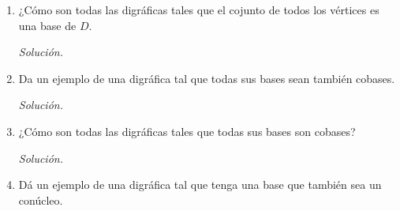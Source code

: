 \documentclass[12pt, fleqn]{article}
\newcommand{\tray}[2]{$ #1 #2 $ -- trayectoria}
\begin{document}
\begin{enumerate}
		Además, para $ u_4 $ no existe ninguna \tray{u_1}{u_4} ni una \tray{u_{13}}{u_4} en $D$, por lo que $ B $ tiene más elementos. Ya que la trayectoria $ T = (u_{11}, u_{10}, u_9, u_8, u_7, u_6, u_5, u_4) $ contiene a los demás vértices de $D$, se tiene que solo uno de estos vértices pertenece a $ B $, pues si más de uno perteneciera, entonces es posible hallar una trayectoria contenida en $T$ entre dos vértices de $ B $, lo cual sería a una contradicción al Teorema 21. 

		Ahora, $ u_4, u_5 \notin B $, ya que no es posible hallar una \tray{u_4}{u_6} ni una \tray{u_5}{u_6} en $D$. Pero si es posible hallar una \tray{u_i}{u_j} en $D$ para cada $ i = 6, \ldots, 11 $ y para cada $ j = 4, \ldots, 11 $. De esta forma, las siguientes son bases de $D$: 

		$ B_1 = \left\lbrace u_1, u_{6}, u_{13} \right\rbrace, B_2 = \left\lbrace u_1, u_{7}, u_{13} \right\rbrace, B_3 = \left\lbrace u_1, u_{8}, u_{13} \right\rbrace, B_4 = \left\lbrace u_1, u_{9}, u_{13} \right\rbrace, B_5 = \left\lbrace u_1, u_{10}, u_{13} \right\rbrace$ y $ B_6 = \left\lbrace u_1, u_{11}, u_{13} \right\rbrace $.

		Por otro lado, los vértices de ingrado cero y exgrado mayor a cero no pertenecen a ninguna co-base de $D$, puesto que no hay trayectorias que terminen en estos
		\item ¿Cómo son todas las digráficas tales que el cojunto de todos los vértices es una base de $D$.
		
		\emph{Solución.}

		
		
		\item Da un ejemplo de una digráfica tal que todas sus bases sean también cobases.
		
		\emph{Solución.}

		
		
		\item ¿Cómo son todas las digráficas tales que todas sus bases son cobases?
		
		\emph{Solución.}

		
		
		\item Dá un ejemplo de una digráfica tal que tenga una base que también sea un conúcleo.
		

\end{enumerate}
\end{document}
